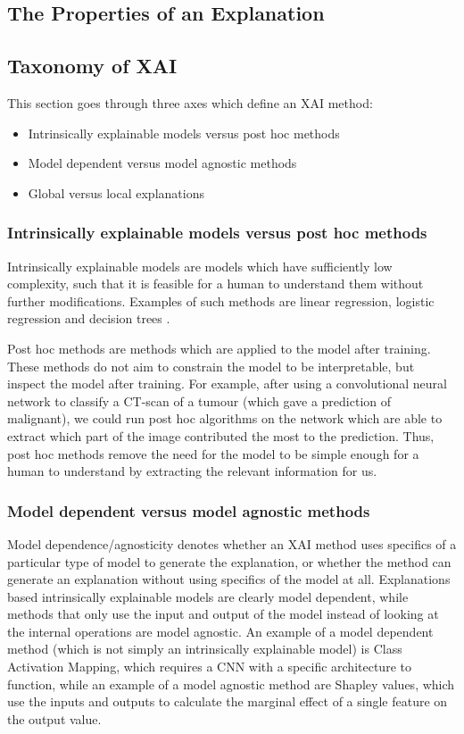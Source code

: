 \documentclass[UKenglish]{uiomasterthesis} %
\theoremstyle{definition}
\begin{document}
\subsection{The Properties of an Explanation}

\subsection{Taxonomy of XAI}

This section goes through three axes which define an XAI method:

\begin{itemize}
  \item Intrinsically explainable models versus post hoc methods
  \item Model dependent versus model agnostic methods
  \item Global versus local explanations
\end{itemize}


\subsubsection{Intrinsically explainable models versus post hoc methods}

Intrinsically explainable models are models which have sufficiently low complexity, such that it is feasible for a human to understand them without further modifications. Examples of such methods are linear regression, logistic regression and decision trees \cite{molnar}. 

Post hoc methods are methods which are applied to the model after training. These methods do not aim to constrain the model to be interpretable, but inspect the model after training. For example, after using a convolutional neural network to classify a CT-scan of a tumour (which gave a prediction of malignant), we could run post hoc algorithms on the network which are able to extract which part of the image contributed the most to the prediction. Thus, post hoc methods remove the need for the model to be simple enough for a human to understand by extracting the relevant information for us.

\subsubsection{Model dependent versus model agnostic methods}

Model dependence/agnosticity denotes whether an XAI method uses specifics of a particular type of model to generate the explanation, or whether the method can generate an explanation without using specifics of the model at all. Explanations based intrinsically explainable models are clearly model dependent, while methods that only use the input and output of the model instead of looking at the internal operations are model agnostic. An example of a model dependent method (which is not simply an intrinsically explainable model) is Class Activation Mapping, which requires a CNN with a specific architecture to function, while an example of a model agnostic method are Shapley values, which use the inputs and outputs to calculate the marginal effect of a single feature on the output value.
\end{document}
